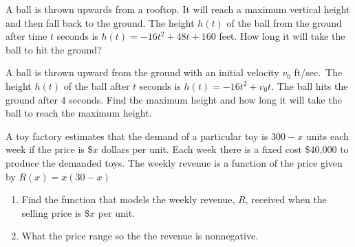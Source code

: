 \begin{exercise}

A ball is thrown upwards from a rooftop. It will reach a maximum
vertical height and then fall back to the ground. The height \(h(t)\) of
the ball from the ground after time \(t\) seconds is
\(h(t)=-16t^2 + 48t + 160\) feet. How long it will take the ball to hit
the ground?

\end{exercise}
\vspace*{6\baselineskip}

\begin{exercise}

A ball is thrown upward from the ground with an initial velocity \(v_0\)
ft/sec.~The height \(h(t)\) of the ball after \(t\) seconds is
\(h(t)= -16t^2 + v_0t\). The ball hits the ground after 4 seconds. Find
the maximum height and how long it will take the ball to reach the
maximum height.

\end{exercise}
\vspace*{6\baselineskip}

\begin{exercise}

A toy factory estimates that the demand of a particular toy is
\(300 -x\) units each week if the price is \$\(x\) dollars per unit.
Each week there is a fixed cost \$40,000 to produce the demanded toys.
The weekly revenue is a function of the price given by \(R(x)=x(30-x)\)

\begin{enumerate}
\item
  Find the function that models the weekly revenue, \(R\), received when
  the selling price is \$\(x\) per unit.
\item
  What the price range so the the revenue is nonnegative.
\end{enumerate}

\end{exercise}

